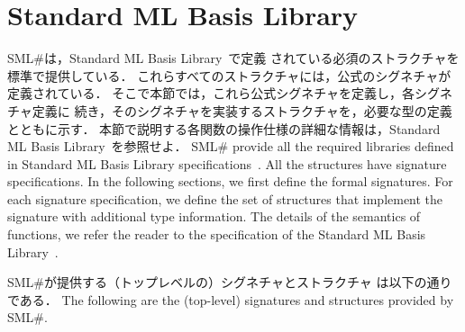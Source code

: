 \documentclass{jbook}
\newcommand{\txt}[2]{#2}
\newcommand{\smlsharp}{SML\#}
\begin{document}
\chapter{\txt{Standard ML標準Library}{Standard ML Basis Library}}

\ifjp%
	\smlsharp{}は，Standard ML Basis Library~\cite{smlbasis}で定義
されている必須のストラクチャを標準で提供している．
	これらすべてのストラクチャには，公式のシグネチャが定義されている．
	そこで本節では，これら公式シグネチャを定義し，各シグネチャ定義に
続き，そのシグネチャを実装するストラクチャを，必要な型の定義とともに示す．
	本節で説明する各関数の操作仕様の詳細な情報は，Standard ML Basis
Library~\cite{smlbasis}を参照せよ．
\else%
	\smlsharp{} provide all the required libraries defined in
Standard ML Basis Library specifications~\cite{smlbasis}.
	All the structures have signature specifications.
	In the following sections, we first define the formal signatures.
	For each signature specification, we define the set of
structures that implement the signature with additional type information.
	The details of the semantics of functions, we refer the reader
to the specification of the Standard ML Basis Library~\cite{smlbasis}.
\fi%

\ifjp%
	\smlsharp{}が提供する（トップレベルの）シグネチャとストラクチャ
は以下の通りである．
\else%
	The following are the (top-level) signatures and structures
provided by \smlsharp.
\fi%
\end{document}
